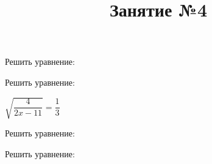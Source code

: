\newpage
\title{Занятие №4}
\begin{listofex}
	\item Решить уравнение:
	\begin{enumcols}[itemcolumns=2]
		\item {}
		\item {}
		\item {}
		\item {}
	\end{enumcols}
	\item Решить уравнение:
	\begin{enumcols}[itemcolumns=2]
		\item \( \sqrt{\dfrac{4}{2x-11}}=\dfrac{1}{3} \)
		\item {}
		\item {}
		\item {}
	\end{enumcols}
	\item Решить уравнение:
	\begin{enumcols}[itemcolumns=2]
		\item {}
		\item {}
		\item {}
		\item {}
		\item {}
	\end{enumcols}
	\item Решить уравнение:
	\begin{enumcols}[itemcolumns=2]
		\item {}
		\item {}
		\item {}
		\item {}
	\end{enumcols}
\end{listofex}
